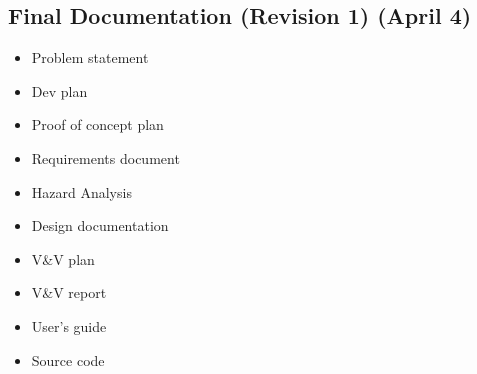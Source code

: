 \documentclass{article}
\begin{document}
	\subsection{Final Documentation (Revision 1) (April 4)}
	\begin{itemize}
		\item Problem statement
		\item Dev plan
		\item Proof of concept plan
		\item Requirements document
		\item Hazard Analysis
		\item Design documentation
		\item V\&V plan
		\item V\&V report
		\item User’s guide
		\item Source code
	\end{itemize}
\end{document}
